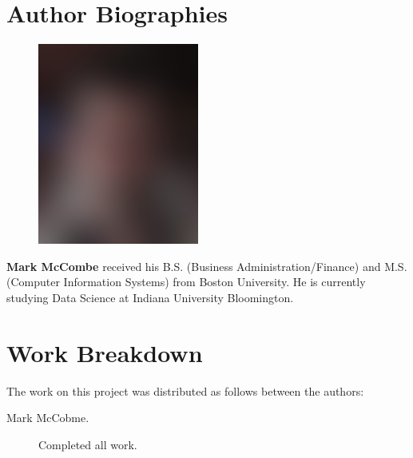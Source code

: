 \documentclass[9pt,twocolumn,twoside]{../../styles/osajnl}
\begin{document}
\section*{Author Biographies}
\begingroup
\setlength\intextsep{0pt}
\begin{minipage}[t][3.2cm][t]{1.0\columnwidth} %
  \begin{figure}
    \includegraphics[width=0.25\columnwidth]{images/john_smith.eps}
  \end{figure}
  \noindent
{\bfseries Mark McCombe} received his B.S. (Business Administration/Finance) and M.S. (Computer Information Systems) from Boston University.  He is currently studying Data Science at Indiana University Bloomington.

\end{minipage}
\endgroup

\newpage

\appendix

\section{Work Breakdown}

The work on this project was distributed as follows between the
authors:

\begin{description}

\item[Mark McCobme.] Completed all work.

\end{description}
\end{document}
